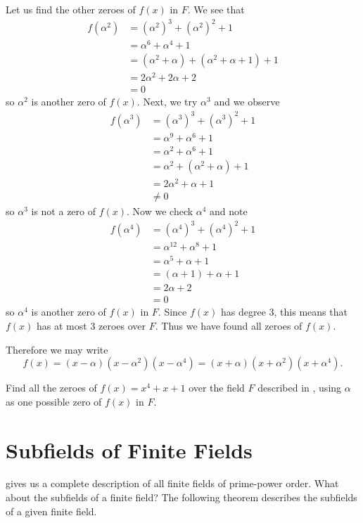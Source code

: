 \begin{example}
    Let us find the other zeroes of $f(x)$ in $F$. We see that
    \begin{align*}
        f(\alpha^2) &= (\alpha^2)^3 + (\alpha^2)^2 + 1\\
        &= \alpha^6 + \alpha^4 + 1\\
        &= (\alpha^2 + \alpha) + (\alpha^2 + \alpha + 1) + 1\\
        &= 2\alpha^2 + 2\alpha + 2\\
        &= 0
    \end{align*}
    so $\alpha^2$ is another zero of $f(x)$. Next, we try $\alpha^3$ and we observe
    \begin{align*}
        f(\alpha^3) &= (\alpha^3)^3 + (\alpha^3)^2 + 1\\
        &= \alpha^9 + \alpha^6 + 1\\
        &= \alpha^2 + \alpha^6 + 1\\
        &= \alpha^2 + (\alpha^2 + \alpha) + 1\\
        &= 2\alpha^2 + \alpha + 1\\
        &\neq 0
    \end{align*}
    so $\alpha^3$ is not a zero of $f(x)$. Now we check $\alpha^4$ and note
    \begin{align*}
        f(\alpha^4) &= (\alpha^4)^3 + (\alpha^4)^2 + 1\\
        &= \alpha^{12} + \alpha^8 + 1\\
        &= \alpha^5 + \alpha + 1\\
        &= (\alpha + 1) + \alpha + 1\\
        &= 2\alpha + 2\\
        &= 0
    \end{align*}
    so $\alpha^4$ is another zero of $f(x)$ in $F$. Since $f(x)$ has degree 3, this means that $f(x)$ has at most 3 zeroes over $F$. Thus we have found all zeroes of $f(x)$.

    Therefore we may write
    \[
        f(x) = (x - \alpha)(x - \alpha^2)(x - \alpha^4) = (x + \alpha)(x + \alpha^2)(x + \alpha^4).
    \]
\end{example}

\begin{exercise}
    Find all the zeroes of $f(x) = x^4 + x + 1$ over the field $F$ described in , using $\alpha$ as one possible zero of $f(x)$ in $F$.
\end{exercise}

\section{Subfields of Finite Fields}
 gives us a complete description of all finite fields of prime-power order. What about the subfields of a finite field? The following theorem describes the subfields of a given finite field.

